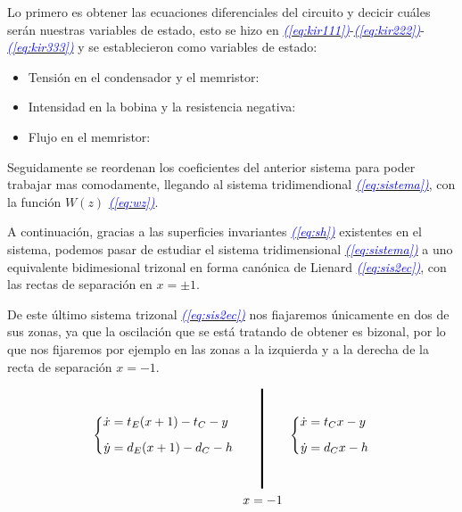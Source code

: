 \documentclass[12pt,a4paper]{report} %
\newcommand{\eref}[1]{\hyperref[#1]{\textcolor{blue}{\textit{(\ref*{#1})}}}}
\begin{document}
	\vspace{0.5cm} Lo primero es obtener las ecuaciones diferenciales del circuito y decicir cuáles serán nuestras variables de estado, esto se hizo en \eref{eq:kir111}-\eref{eq:kir222}-\eref{eq:kir333} y se establecieron como variables de estado:
	
	\begin{itemize}
		\item Tensión en el condensador y el memristor: 
		\item Intensidad en la bobina y la resistencia negativa: 
		\item Flujo en el memristor: 
	\end{itemize}
	
	\vspace{0.5cm} Seguidamente se reordenan los coeficientes del anterior sistema para poder trabajar mas comodamente, llegando al sistema tridimendional \eref{eq:sistema}, con la función $W(z)$ \eref{eq:wz}.
	
	\vspace{0.5cm} A continuación, gracias a las superficies invariantes \eref{eq:sh} existentes en el sistema, podemos pasar de estudiar el sistema tridimensional \eref{eq:sistema} a uno equivalente bidimesional trizonal en forma canónica de Lienard \eref{eq:sis2ec}, con las rectas de separación en $x=\pm1$.
	
	\vspace{0.5cm} De este último sistema trizonal \eref{eq:sis2ec} nos fiajaremos únicamente en dos de sus zonas, ya que la oscilación que se está tratando de obtener es bizonal, por lo que nos fijaremos por ejemplo en las zonas a la izquierda y a la derecha de la recta de separación $x=-1$.
	
	\begin{equation}
		\label{eq:sisbiz}
		\begin{gathered}
			\left\{
			\begin{aligned}
				\dot{x}&=t_E(x+1)-t_C-y
				\\[2mm]
				\dot{y}&=d_E(x+1)-d_C-h
			\end{aligned}
			\right. \qquad 
			\rule[-40pt]{1.5pt}{80pt} \qquad 
			\left\{
			\begin{aligned}
				\dot{x}&=t_Cx-y
				\\[2mm]
				\dot{y}&=d_Cx-h
			\end{aligned}
			\right. \\ \quad\qquad\qquad x=-1
		\end{gathered}
	\end{equation}\smallskip
	
\end{document}
